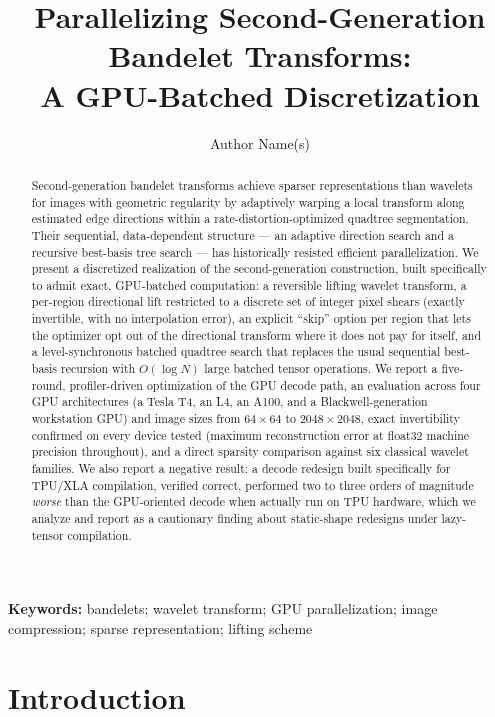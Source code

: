 \documentclass[11pt]{article}
\title{Parallelizing Second-Generation Bandelet Transforms:\\
A GPU-Batched Discretization}
\author[1]{Author Name(s) \todo{fill in}}
\affil[1]{Institution, Department \todo{fill in}}
\date{}
\begin{document}
\maketitle

\begin{abstract}
Second-generation bandelet transforms \citep{peyre2005surface,peyre2005discrete}
achieve sparser representations than wavelets for images with geometric
regularity by adaptively warping a local transform along estimated edge
directions within a rate-distortion-optimized quadtree segmentation. Their
sequential, data-dependent structure --- an adaptive direction search and a
recursive best-basis tree search --- has historically resisted efficient
parallelization. We present a discretized realization of the second-generation
construction, built specifically to admit exact, GPU-batched computation: a
reversible lifting wavelet transform, a per-region directional lift restricted
to a discrete set of integer pixel shears (exactly invertible, with no
interpolation error), an explicit ``skip'' option per region that lets the
optimizer opt out of the directional transform where it does not pay for
itself, and a level-synchronous batched quadtree search that replaces the
usual sequential best-basis recursion with $O(\log N)$ large batched tensor
operations. We report a five-round, profiler-driven optimization of the
GPU decode path, an evaluation across four GPU architectures (a Tesla T4, an
L4, an A100, and a Blackwell-generation workstation GPU) and image sizes from
$64\times64$ to $2048\times2048$, exact invertibility confirmed on every
device tested (maximum reconstruction error at float32 machine precision
throughout), and a direct sparsity comparison against six classical wavelet
families. We also report a negative result: a decode redesign built
specifically for TPU/XLA compilation, verified correct, performed two to
three orders of magnitude \emph{worse} than the GPU-oriented decode when
actually run on TPU hardware, which we analyze and report as a cautionary
finding about static-shape redesigns under lazy-tensor compilation.
\end{abstract}

\textbf{Keywords:} bandelets; wavelet transform; GPU parallelization; image
compression; sparse representation; lifting scheme

\section{Introduction}
\label{sec:intro}
\end{document}
